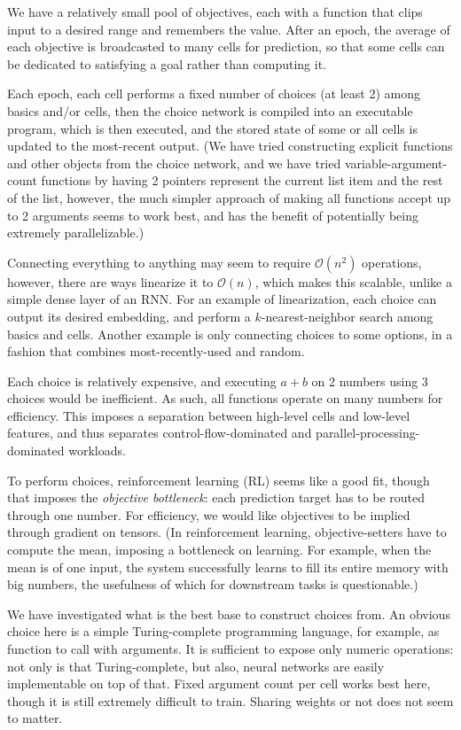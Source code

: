\documentclass{article}
\begin{document}
We have a relatively small pool of objectives, each with a function that clips input to a desired range and remembers the value. After an epoch, the average of each objective is broadcasted to many cells for prediction, so that some cells can be dedicated to satisfying a goal rather than computing it.

Each epoch, each cell performs a fixed number of choices (at least 2) among basics and/or cells, then the choice network is compiled into an executable program, which is then executed, and the stored state of some or all cells is updated to the most-recent output. (We have tried constructing explicit functions and other objects from the choice network, and we have tried variable-argument-count functions by having 2 pointers represent the current list item and the rest of the list, however, the much simpler approach of making all functions accept up to 2 arguments seems to work best, and has the benefit of potentially being extremely parallelizable.)

Connecting everything to anything may seem to require $\mathcal{O}(n^2)$ operations, however, there are ways linearize it to $\mathcal{O}(n)$, which makes this scalable, unlike a simple dense layer of an RNN. For an example of linearization, each choice can output its desired embedding, and perform a $k$-nearest-neighbor search among basics and cells. Another example is only connecting choices to some options, in a fashion that combines most-recently-used and random.

Each choice is relatively expensive, and executing $a+b$ on 2 numbers using 3 choices would be inefficient. As such, all functions operate on many numbers for efficiency. This imposes a separation between high-level cells and low-level features, and thus separates control-flow-dominated and parallel-processing-dominated workloads.

To perform choices, reinforcement learning (RL) seems like a good fit, though that imposes the \textit{objective bottleneck}: each prediction target has to be routed through one number. For efficiency, we would like objectives to be implied through gradient on tensors. (In reinforcement learning, objective-setters have to compute the mean, imposing a bottleneck on learning. For example, when the mean is of one input, the system successfully learns to fill its entire memory with big numbers, the usefulness of which for downstream tasks is questionable.)

We have investigated what is the best base to construct choices from. An obvious choice here is a simple Turing-complete programming language, for example, as function to call with arguments. It is sufficient to expose only numeric operations: not only is that Turing-complete, but also, neural networks are easily implementable on top of that. Fixed argument count per cell works best here, though it is still extremely difficult to train. Sharing weights or not does not seem to matter.
\end{document}
